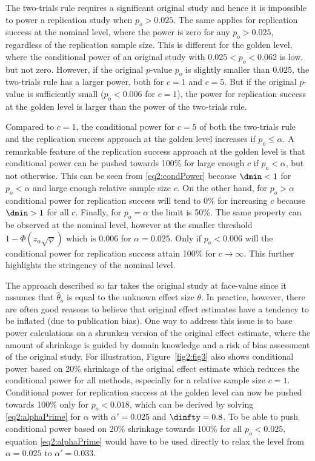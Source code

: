 The two-trials rule requires a significant original study and hence it is
impossible to power a replication study when $p_o > 0.025$. The same applies for
replication success at the nominal level, where the power is zero for any
$p_o > 0.025$, regardless of the replication sample size. This is different for
the golden level, where the conditional power of an original study with
$0.025 < p_o < 0.062$ is low, but not zero. However, if the original $p$-value
$p_o$ is slightly smaller than $0.025$, the two-trials rule has a larger power,
both for $c=1$ and $c=5$. But if the original $p$-value is sufficiently small
($p_o < 0.006$ for $c=1$), the power for replication success at the golden level
is larger than the power of the two-trials rule.


Compared to $c=1$, the conditional power for $c=5$ of both the two-trials rule
and the replication success approach at the golden level increases if
$p_o \leq \alpha$. A remarkable feature of the replication success approach at
the golden level is that conditional power can be pushed towards 100\% for large
enough $c$ if $p_o<\alpha$, but not otherwise. This can be seen from
\eqref{eq2:condPower} because $\dmin < 1$ for $p_o<\alpha$ and large enough
relative sample size $c$. On the other hand, for $p_o > \alpha$ conditional
power for replication success will tend to 0\% for increasing $c$ because
$\dmin>1$ for all $c$. Finally, for $p_o = \alpha$ the limit is 50\%. The same
property can be observed at the nominal level, however at the smaller threshold
$1-\Phi(z_\alpha \sqrt{\varphi})$ which is $0.006$ for $\alpha=0.025$. Only if
$p_o < 0.006$ will the conditional power for replication success attain 100\%
for $c \to \infty$. This further highlights the stringency of the nominal level.

The approach described so far takes the original study at face-value since it
assumes that $\hat \theta_o$ is equal to the unknown effect size $\theta$. In
practice, however, there are often good reasons to believe that original effect
estimates have a tendency to be inflated (\eg due to publication bias). One way
to address this issue is to base power calculations on a shrunken version of the
original effect estimate, where the amount of shrinkage is guided by domain
knowledge and a risk of bias assessment of the original study. For illustration,
Figure~\ref{fig2:fig3} also shows conditional power based on 20\% shrinkage of
the original effect estimate which reduces the conditional power for all
methods, especially for a relative sample size $c = 1$. Conditional power for
replication success at the golden level can now be pushed towards 100\% only for
$p_o < 0.018$, which can be derived by solving \eqref{eq2:alphaPrime} for
$\alpha$ with $\alpha'=0.025$ and $\dinfty=0.8$. To be able to push conditional
power based on 20\% shrinkage towards 100\% for all $p_o < 0.025$, equation
\eqref{eq2:alphaPrime} would have to be used directly to relax the level from
$\alpha=0.025$ to $\alpha'=0.033$.


